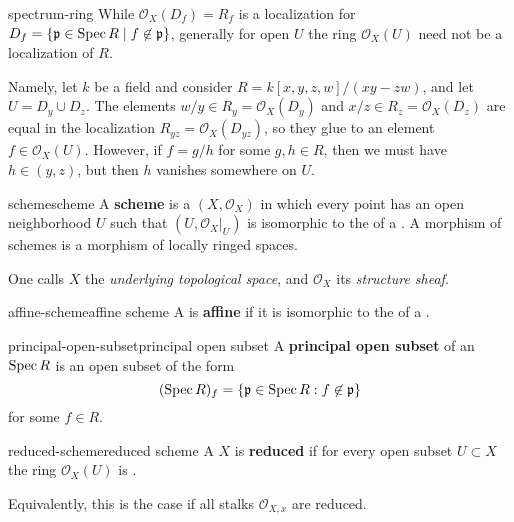 \begin{example}{spectrum-ring}
    While $\mathcal{O}_X(D_f) = R_f$ is a localization for  $D_f = \{ \mathfrak{p} \in \operatorname{Spec} R \mid f \not\in \mathfrak{p} \}$, generally for open $U$ the ring $\mathcal{O}_X(U)$ need not be a localization of $R$.
    
    Namely, let $k$ be a field and consider $R = k[x, y, z, w] / (xy - zw)$, and let $U = D_y \cup D_z$. The elements $w/y \in R_y = \mathcal{O}_X(D_y)$ and $x/z \in R_z = \mathcal{O}_X(D_z)$ are equal in the localization $R_{yz} = \mathcal{O}_X(D_{yz})$, so they glue to an element $f \in \mathcal{O}_X(U)$. However, if $f = g/h$ for some $g, h \in R$, then we must have $h \in (y, z)$, but then $h$ vanishes somewhere on $U$.
\end{example}

\begin{topic}{scheme}{scheme}
    A \textbf{scheme} is a  $(X, \mathcal{O}_X)$ in which every point has an open neighborhood $U$ such that $(U, \mathcal{O}_X|_U)$ is isomorphic to the  of a . A morphism of schemes is a morphism of locally ringed spaces.
    
    One calls $X$ the \textit{underlying topological space}, and $\mathcal{O}_X$ its \textit{structure sheaf}.
\end{topic}

\begin{topic}{affine-scheme}{affine scheme}
    A  is \textbf{affine} if it is isomorphic to the  of a .
\end{topic}

\begin{topic}{principal-open-subset}{principal open subset}
    A \textbf{principal open subset} of an  $\operatorname{Spec} R$ is an open subset of the form
    \[ (\operatorname{Spec} R)_f = \{ \mathfrak{p} \in \operatorname{Spec} R : f \not\in \mathfrak{p} \} \]
    for some $f \in R$.
\end{topic}

\begin{topic}{reduced-scheme}{reduced scheme}
    A  $X$ is \textbf{reduced} if for every open subset $U \subset X$ the ring $\mathcal{O}_X(U)$ is .
    
    Equivalently, this is the case if all stalks $\mathcal{O}_{X, x}$ are reduced.
\end{topic}

